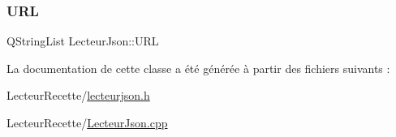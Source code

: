 \mbox{\label{class_lecteur_json_ac4e3585c5c083c669273346ac6910353}} 
\subsubsection{\texorpdfstring{U\+RL}{URL}}
{\footnotesize\ttfamily Q\+String\+List Lecteur\+Json\+::\+U\+RL\hspace{0.3cm}{\ttfamily [private]}}



La documentation de cette classe a été générée à partir des fichiers suivants \+:\begin{DoxyCompactItemize}
\item 
Lecteur\+Recette/\hyperlink{lecteurjson_8h}{lecteurjson.\+h}\item 
Lecteur\+Recette/\hyperlink{_lecteur_json_8cpp}{Lecteur\+Json.\+cpp}\end{DoxyCompactItemize}
